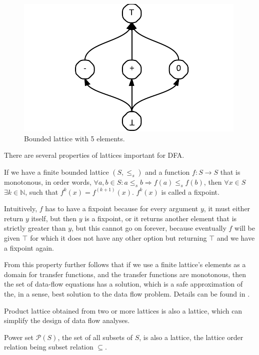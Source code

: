 \begin{figure}[h]  
  \centering
    \includegraphics{img/lattice.pdf}
  \caption{Bounded lattice with 5 elements.\label{lattice}}    
\end{figure}

        There are several properties of lattices important for DFA.
        
        If we have a finite bounded lattice $(S, \leq_{s})$ and a function 
        $f:S\rightarrow{S}$ that is monotonous, in order words, 
        $\forall{a,b\in{S}}: a\leq_s{b} \Rightarrow f(a)\leq_s{f(b)}$, 
        then $\forall{x\in{S}}$ $\exists{k\in\mathbb{N}}$, such that 
        $f^k(x)=f^{(k+1)}(x)$. $f^k(x)$ is called a fixpoint.
        
        Intuitively, $f$ has to have a fixpoint because 
        for every argument $y$, it must either return 
        $y$ itself, but then $y$ is a fixpoint, or it 
        returns another element that is strictly 
        greater than $y$, but this cannot go on forever, because eventually 
        $f$ will be given $\top$ for which it does not have 
        any other option but returning $\top$ and we 
        have a fixpoint again.
        
        From this property further follows that if we use a finite 
        lattice's elements as a domain for transfer functions, 
        and the transfer functions are monotonous, then the set of 
        data-flow equations has a solution, which is a safe 
        approximation of the, in a sense, best solution to the 
        data flow problem. Details can be found in \cite{kildall1973unified}.
        
        Product lattice obtained from two or more lattices 
        is also a lattice, which can simplify the design of 
        data flow analyses.

        Power set $\mathcal{P}(S)$, the set of all subsets of $S$, 
        is also a lattice, the lattice order relation 
        being subset relation $\subseteq$.

